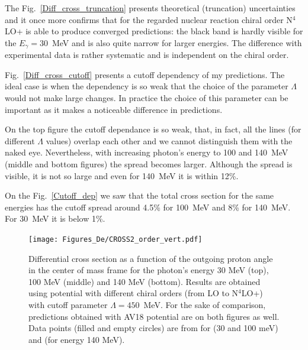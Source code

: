     The Fig.~\ref{Diff_cross_truncation} 
    presents theoretical (truncation) uncertainties and it once more
    confirms that for the regarded nuclear reaction chiral order
    N$^4$LO+ is able to produce converged predictions: 
    the black band is hardly visible for the $E_\gamma=30$~MeV 
    and is also quite narrow for larger energies. 
    The difference with experimental data is rather systematic 
    and is independent on the chiral order. 

    Fig.~\ref{Diff_cross_cutoff} presents a cutoff dependency
    of my predictions. The ideal case is when the dependency is so weak that
    the choice of the parameter $\Lambda$ would not make large 
    changes. In practice the choice of this parameter can be 
    important as it makes a noticeable difference in predictions.
    
    On the top figure the cutoff dependance is so weak,
    that, in fact, all the lines (for different $\Lambda$ values)
    overlap each other and we cannot distinguish them with the naked eye.
    Nevertheless, with increasing photon's energy to 100 and 140~MeV 
    (middle and bottom figures) the spread becomes larger. 
    Although the spread is visible, it is not so large and even for 140~MeV
    it is within 12\%. 

    On the Fig.~\ref{Cutoff_dep} we saw that the total
    cross section for the same energies has the cutoff spread
    around 4.5\% for 100~MeV and 8\% for 140~MeV. For 30~MeV it is below 1\%.  
    

    \begin{figure}[h]
        \begin{center}
        \texttt{[image: Figures\_De/CROSS2\_order\_vert.pdf]}
        \end{center}
        \caption{Differential cross section as a function of the outgoing proton angle in the center of mass frame 
        for the photon's energy 30 MeV (top), 100 MeV (middle) and 140 MeV (bottom). Results are obtained using potential
        with different chiral orders (from LO to N$^4$LO+) with cutoff parameter $\Lambda=450$~MeV.
        For the sake of comparison, predictions obtained with AV18 potential are on both figures as well.
        Data points (filled and empty circles) are from \cite{Ying_Experiment_Deut}
        for (30 and 100 meV)
        and \cite{DeSanctis_Experiment_Deut} (for energy 140 MeV).}
        \label{Diff_cross_order}
    \end{figure}


